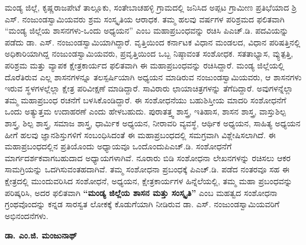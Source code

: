 ಮಂಡ್ಯ ಜಿಲ್ಲೆ, ಕೃಷ್ಣರಾಜಪೇಟೆ ತಾಲ್ಲೂಕು, ಸಂತೇಬಾಚಹಳ್ಳಿ ಗ್ರಾಮದಲ್ಲಿ ಜನಿಸಿದ ಅಪ್ಪಟ ಗ್ರಾಮೀಣ ಪ್ರತಿಭೆಯಾದ ಶ್ರಿ ಎಸ್​. ನಂಜುಂಡಸ್ವಾಮಿಯವರು ಶ್ರಮ ಸಂಸ್ಕೃತಿಯ ಆರಾಧಕ.   ತಮ್ಮ ಹಲವು ವರ್ಷಗಳ ಪರಿಶ್ರಮದ ಫಲಿತವಾಗಿ “ಮಂಡ್ಯ ಜಿಲ್ಲೆಯ ಶಾಸನಗಳು-ಒಂದು ಅಧ್ಯಯನ” ಎಂಬ ಮಹಾಪ್ರಬಂಧವನ್ನು ರಚಿಸಿ ಪಿಎಚ್​.ಡಿ. ಪದವಿಯನ್ನು ಪಡೆದು ಡಾ. ಎಸ್​. ನಂಜುಂಡಸ್ವಾಮಿಯಾಗಿದ್ದಾರೆ. ವೃತ್ತಿಯಿಂದ ಕರ್ನಾಟಕ ವಿಧಾನ ಮಂಡಲದ, ವಿಧಾನ ಪರಿಷತ್ತಿನಲ್ಲಿ ಅಧಿಕಾರಿಯಾಗಿದ್ದ ನಂಜುಂಡಸ್ವಾಮಿಯವರು, ಪ್ರವೃತ್ತಿಯಿಂದ ಒಬ್ಬ ನಿಷ್ಠಾವಂತ ಸಂಶೋಧಕ. ಸತತಾಭ್ಯಾಸ, ವ್ಯುತ್ಪತ್ತಿ, ಪರಿಶ್ರಮ ಮತ್ತು  ವ್ಯಾಪಕ ಕ್ಷೇತ್ರಕಾರ್ಯದ ಫಲಿತವಾಗಿ ಈ ಮಹಾಪ್ರಬಂಧವನ್ನು ರಚಿಸಿದ್ದಾರೆ. ಮಂಡ್ಯ ಜಿಲ್ಲೆಯಲ್ಲಿ ದೊರೆತಿರುವ ಎಲ್ಲ ಶಾಸನಗಳನ್ನೂ ತಲಸ್ಪರ್ಷಿಯಾಗಿ ಅಧ್ಯಯನ ಮಾಡಿರುವ ನಂಜುಂಡಸ್ವಾಮಿಯವರು, ಆ ಶಾಸನಗಳು ಇರುವ ಸ್ಥಳಗಳ\-ಲ್ಲೆಲ್ಲಾ ಕ್ಷೇತ್ರ ಪರಿವೀಕ್ಷಣೆ ಮಾಡಿದ್ದಾರೆ. ಸಾವಿರಾರು ಛಾಯಾಚಿತ್ರಗಳನ್ನು ತೆಗೆದಿದ್ದಾರೆ. ಅವುಗಳನ್ನೆಲ್ಲಾ ತಮ್ಮ ಮಹಾಪ್ರಬಂಧ ರಚನೆಗೆ ಬಳಸಿಕೊಂಡಿದ್ದಾರೆ.  ಈ ಸಂಶೋಧನೆಯು ಬಹುಶಿಸ್ತೀಯ ಮಾದರಿ ಸಂಶೋಧನೆಗೆ ಒಂದು ಅತ್ಯುತ್ತಮ ಉದಾಹರಣೆ ಎಂದು ಹೇಳಬಹುದು. ಪುರಾತತ್ತ್ವ ಶಾಸ್ತ್ರ, ಇತಿಹಾಸ, ಶಾಸನ ಶಾಸ್ತ್ರ, ವಾಸ್ತುಶಿಲ್ಪ ಶಾಸ್ತ್ರ, ಶಿಲ್ಪ ಶಾಸ್ತ್ರ, ಸಮಾಜ ಶಾಸ್ತ್ರ,  ಧಾರ್ಮಿಕ ಅಧ್ಯಯನ, ನೀರಾವರಿ ವ್ಯವಸ್ಥೆ, ಆರ್ಥಿಕ ಅಧ್ಯಯನ, ಸಾಹಿತ್ಯ ಅಧ್ಯಯನ ಹೀಗೆ ಹಲವು ಜ್ಞಾನಶಿಸ್ತುಗಳಿಗೆ ಸಂಬಂಧಿಸಿದಂತೆ ಈ ಮಹಾಪ್ರಬಂಧದಲ್ಲಿ ಸಮಗ್ರವಾಗಿ ವಿಶ್ಲೇಷಿಸಲಾಗಿದೆ. ಈ ಮಹಾಪ್ರಬಂಧದಲ್ಲಿನ ಪ್ರತಿಯೊಂದು ಅಧ್ಯಾಯವೂ ಒಂದೊಂದು\break ಪಿಎಚ್​.ಡಿ. ಸಂಶೋಧನೆಗೆ ಮಾರ್ಗದರ್ಶಕವಾಗಬಹುದಾದ ಅಧ್ಯಾಯಗಳಾಗಿವೆ. ನೂರಾರು ಬಿಡಿ ಸಂಶೋಧನಾ ಲೇಖನಗಳನ್ನು ರಚಿಸಲು ಆಕರ ಸಾಮಗ್ರಿಯನ್ನು ಒದಗಿಸುವಂತಹದಾಗಿವೆ. ತಮ್ಮ ಸಂಶೋಧನಾ ಪ್ರಬಂಧಕ್ಕೆ ಪಿಎಚ್​.ಡಿ. ಪಡೆದ ನಂತರವೂ ಸಹ ಈ ಕ್ಷೇತ್ರದಲ್ಲಿ ಮುಂದುವರಿಸಿದ ಸಂಶೋಧನೆ, ಅಧ್ಯಯನ, ಕ್ಷೇತ್ರಕಾರ್ಯಗಳ ಹಿನ್ನೆಲೆಯಲ್ಲಿ, ತಮ್ಮ ಮಹಾ ಪ್ರಬಂಧವನ್ನು ಪರಿಷ್ಕರಿಸಿ, ಅದರ ಫಲಿತವಾಗಿ \textbf{“ಮಂಡ್ಯ ಜಿಲ್ಲೆಯ ಶಾಸನ ಮತ್ತು ಸಂಸ್ಕೃತಿ”} ಎಂಬ ಮಹತ್ವದ ಸಂಶೋಧನಾ ಗ್ರಂಥ\-ವೊಂದನ್ನು ಕನ್ನಡ ಸಾರಸ್ವತ ಲೋಕಕ್ಕೆ ಕೊಡುಗೆಯಾಗಿ ನೀಡಿರುವ ಡಾ. ಎಸ್​. ನಂಜುಂಡಸ್ವಾಮಿಯವರಿಗೆ ಅಭಿನಂದನೆಗಳು.


\medskip
\bigskip

\noindent
\hfill \textbf{ಡಾ. ಎಂ.ಜಿ. ಮಂಜುನಾಥ್}

